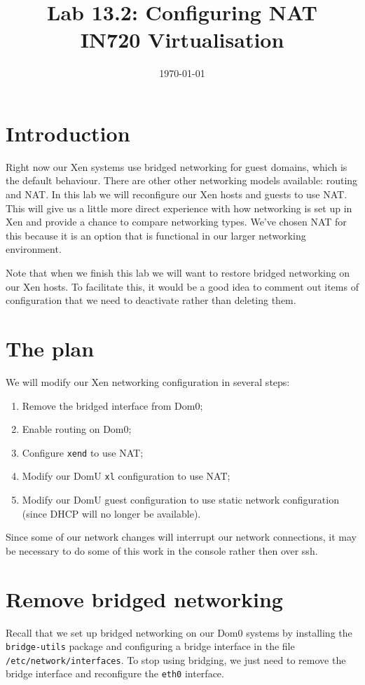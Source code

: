 \documentclass{article}
\begin{document}
\title{Lab 13.2: Configuring NAT\\ IN720 Virtualisation}
\date{\today}
\maketitle

\section*{Introduction}
Right now our Xen systems use bridged networking for guest domains, which is the default behaviour. There are 
other other networking models available: routing and NAT. In this lab we will reconfigure our Xen hosts and guests 
to use NAT. This will give us a little more direct experience with how networking is set up in Xen and provide a chance 
to compare networking types. We've chosen NAT for this because it is an option that is functional in our larger 
networking environment.

Note that when we finish this lab we will want to restore bridged networking on our Xen hosts. To facilitate this, it 
would be a good idea to comment out items of configuration that we need to deactivate rather than deleting them.

\section{The plan}
We will modify our Xen networking configuration in several steps:

\begin{enumerate}
  \item Remove the bridged interface from Dom0;
  \item Enable routing on Dom0;
  \item Configure \texttt{xend} to use NAT;
  \item Modify our DomU \texttt{xl} configuration to use NAT;
  \item Modify our DomU guest configuration to use static network configuration (since DHCP will no longer be available).
\end{enumerate}

Since some of our network changes will interrupt our network connections, it may be necessary to do some of this work in the console rather then over ssh.

\section{Remove bridged networking}
Recall that we set up bridged networking on our Dom0 systems by installing the \texttt{bridge-utils} package and configuring a bridge interface in the file \texttt{/etc/network/interfaces}. To stop using bridging, we just need to remove 
the bridge interface and reconfigure the \texttt{eth0} interface.
\end{document}
